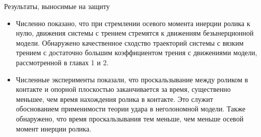 \begin{frame}[allowframebreaks]{Результаты, выносимые на защиту}
{\begin{itemize}
{        }
        \item {
            Численно показано, что при стремлении осевого момента инерции ролика к нулю, движения системы с трением стремятся к движениям безынерционной модели. Обнаружено качественное сходство траекторий системы с вязким трением с достаточно большим коэффициентом трения с движениями модели, рассмотренной в главах 1 и 2.
        }
        \item {
            Численные эксперименты показали, что проскальзывание между роликом в контакте и опорной плоскостью заканчивается за время, существенно меньшее, чем время нахождения ролика в контакте. Это служит обоснованием применимости теории удара в неголономной модели. Также обнаружено, что время проскальзывания тем меньше, чем меньше осевой момент инерции ролика.
        }
    \end{itemize}
    }
    \vspace{-10pt}
    \center {
        \textcolor{Periwinkle}{Спасибо за внимание!}
    }
\end{frame}

